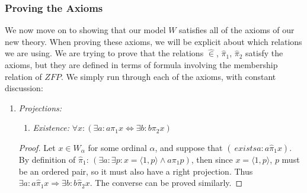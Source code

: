 \documentclass[11pt]{report}
\newcommand{\pleft}{\mathrel{\pi_1}}
\newcommand{\pright}{\mathrel{\pi_2}}
\newcommand{\pair}[2]{\langle #1,#2 \rangle}
\newcommand{\zin}{\mathrel{\widehat{\in}}}
\newcommand{\zpright}{\mathrel{\widehat{\pi}_2}}
\newcommand{\zpleft}{\mathrel{\widehat{\pi}_1}}
\theoremstyle{definition}
\theoremstyle{theorem}
\theoremstyle{lemma}
\begin{document}
\subsubsection{Proving the Axioms}
We now move on to showing that our model $W$ satisfies all of the axioms of our new theory. When proving these axioms, we will be explicit about which relations we are using. We are trying to prove that the relations $\zin$, $\zpleft$, $\zpright$ satisfy the axioms, but they are defined in terms of formula involving the membership relation of $\mathit{ZFP}$. We simply run through each of the axioms, with constant discussion:

\begin{enumerate}[series=axiomlist, label=\Roman*.]
  \item \textit{Projections:}
        \begin{enumerate}[series=sublist, label=(\roman*)]
        \item \textit{Existence:} $\forall x: (\exists a: a\pleft x \Leftrightarrow \exists b: b\pright x)$
        \end{enumerate}
        \begin{proof}
        Let $x\in W_\alpha$ for some ordinal $\alpha$, and suppose that $(\    exists a: a\zpleft x)$.
        By definition of $\zpleft$: $(\exists a: \exists p: x = \pair{1}{p} \wedge a \pleft p)$, then since $x = \pair{1}{p}$, $p$ must be an ordered pair, so it must also have a right projection.
        Thus $\exists a: a\zpleft x \Rightarrow \exists b: b\zpright x$.
        The converse can be proved similarly.
      \end{proof}
\end{enumerate}
\end{document}
